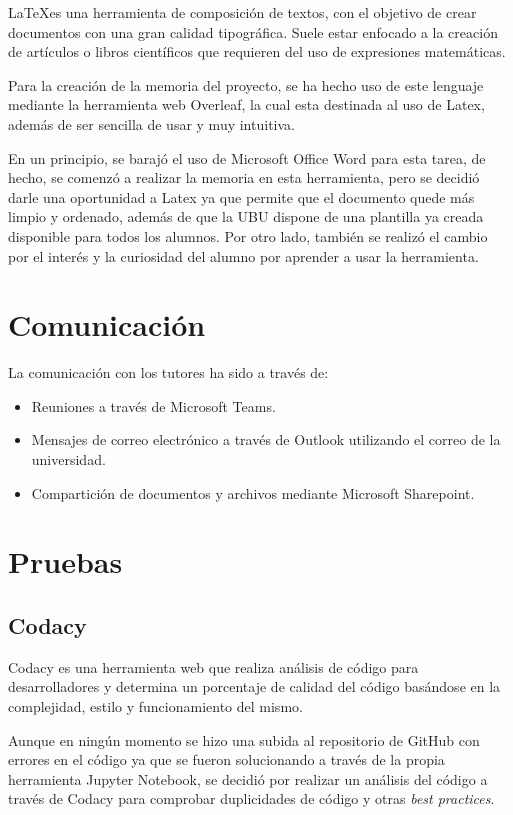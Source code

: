 \LaTeX es una herramienta de composición de textos, con el objetivo de crear documentos con una gran calidad tipográfica. Suele estar enfocado a la creación de artículos o libros científicos que requieren del uso de expresiones matemáticas.

Para la creación de la memoria del proyecto, se ha hecho uso de este lenguaje mediante la herramienta web Overleaf, la cual esta destinada al uso de Latex, además de ser sencilla de usar y muy intuitiva.

En un principio, se barajó el uso de Microsoft Office Word para esta tarea, de hecho, se comenzó a realizar la memoria en esta herramienta, pero se decidió darle una oportunidad a Latex ya que permite que el documento quede más limpio y ordenado, además de que la UBU dispone de una plantilla ya creada disponible para todos los alumnos.
Por otro lado, también se realizó el cambio por el interés y la curiosidad del alumno por aprender a usar la herramienta.


\section{Comunicación}

La comunicación con los tutores ha sido a través de:

\begin{itemize}
    \item Reuniones a través de Microsoft Teams.
    \item Mensajes de correo electrónico a través de Outlook utilizando el correo de la universidad.
    \item Compartición de documentos y archivos mediante Microsoft Sharepoint.
\end{itemize}


\section{Pruebas}

\subsection{Codacy}

Codacy\cite{Codacy} es una herramienta web que realiza análisis de código para desarrolladores y determina un porcentaje de calidad del código basándose en la complejidad, estilo y funcionamiento del mismo.

Aunque en ningún momento se hizo una subida al repositorio de GitHub con errores en el código ya que se fueron solucionando a través de la propia herramienta Jupyter Notebook, se decidió por realizar un análisis del código a través de Codacy para comprobar duplicidades de código y otras \textit{best practices}.
